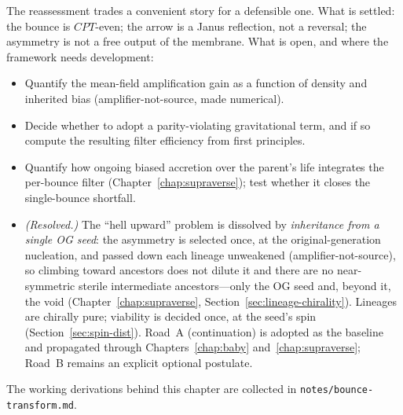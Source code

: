 The reassessment trades a convenient story for a defensible one. What is settled:
the bounce is $CPT$-even; the arrow is a Janus reflection, not a reversal; the
asymmetry is not a free output of the membrane. What is open, and where the
framework needs development:

\begin{itemize}
  \item Quantify the mean-field amplification gain as a function of density and
    inherited bias (amplifier-not-source, made numerical).
  \item Decide whether to adopt a parity-violating gravitational term, and if so
    compute the resulting filter efficiency from first principles.
  \item Quantify how ongoing biased accretion over the parent's life integrates
    the per-bounce filter (Chapter~\ref{chap:supraverse}); test whether it closes
    the single-bounce shortfall.
  \item \emph{(Resolved.)} The ``hell upward'' problem is dissolved by
    \emph{inheritance from a single OG seed}: the asymmetry is selected once, at
    the original-generation nucleation, and passed down each lineage unweakened
    (amplifier-not-source), so climbing toward ancestors does not dilute it and
    there are no near-symmetric sterile intermediate ancestors---only the OG seed
    and, beyond it, the void (Chapter~\ref{chap:supraverse},
    Section~\ref{sec:lineage-chirality}). Lineages are chirally pure; viability is
    decided once, at the seed's spin (Section~\ref{sec:spin-dist}). Road~A
    (continuation) is adopted as the baseline and propagated through
    Chapters~\ref{chap:baby} and~\ref{chap:supraverse}; Road~B remains an explicit
    optional postulate.
\end{itemize}

The working derivations behind this chapter are collected in
\texttt{notes/bounce-transform.md}.
